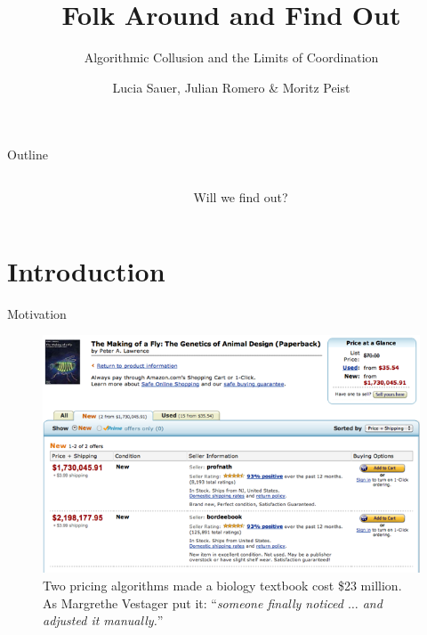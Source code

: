 \documentclass[10pt, aspectratio=169]{beamer}
\title{Folk Around and Find Out}
\subtitle{Algorithmic Collusion and the Limits of Coordination}
\date{}
\author{Lucia Sauer, Julian Romero \& Moritz Peist }
\institute{Barcelona School of Economics}
\begin{document}
\maketitle

\begin{frame}{Outline}
    \begin{columns}[c]
        \begin{column}{0.45\textwidth}
            \tableofcontents
        \end{column}
        \begin{column}{0.45\textwidth}
            \begin{figure}
                \centering
                \caption{Will we find out?}
                \label{fig:fafo}
            \end{figure}
        \end{column}
    \end{columns}
\end{frame}


\section{Introduction}

\begin{frame}{Motivation}
\begin{figure}
        \centering
        \includegraphics[width=0.65\linewidth]{latex/slides_pricing_collusion/imgs/the_making_of_a_fly.png}
        \caption{Two pricing algorithms made a biology textbook cost \$23 million. As Margrethe Vestager \parencite*{vestager_algorithms_2017} put it: \enquote{\emph{someone finally noticed $\ldots$ and adjusted it manually.}}}
        \label{fig:rep_org}
    \end{figure}  
\end{frame}
\end{document}
